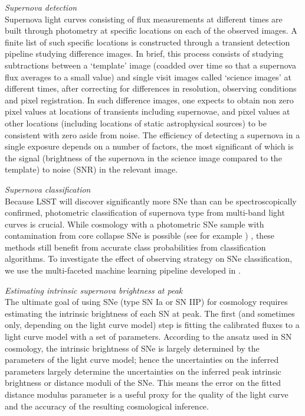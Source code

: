 {\emph{Supernova detection}}\\
Supernova light curves consisting of flux measurements at different times are built through photometry
at specific locations on each of the observed images. A finite list of such specific locations is
constructed through a transient detection pipeline studying difference images. In brief, this process
consists of studying subtractions between a  `template' image (coadded over time so that a supernova
flux averages to a small value) and single visit images called `science images' at different times,
after correcting for differences in resolution, observing conditions and pixel registration. In such
difference images, one expects to obtain non zero pixel values at locations of transients including
supernovae, and pixel values at other locations (including locations of static astrophysical
sources) to be
consistent with zero aside from noise. The efficiency of detecting a supernova in a single
exposure
depends on a number of factors, the most significant of which is the signal (brightness of the supernova
in the science image compared to the template) to noise (SNR) in the relevant image.


{\emph{Supernova classification}}\\
Because LSST will discover significantly more SNe than can be spectroscopically confirmed,
photometric classification of supernova type from multi-band light curves is crucial. While cosmology
with a photometric SNe sample with contamination from core collapse SNe is possible (see for
example 
\citet{Kunz2007,Newling2011,Hlozek2012,Knights2013,Bernstein2012,Gjergo2013,Campbell2013,Rubin2015,Jones2016})
,
these methods still benefit from accurate class probabilities from classification algorithms. To
investigate the effect of observing strategy on SNe classification, we use the multi-faceted machine
learning pipeline developed in \citet{Lochner2016}.


{\emph{Estimating intrinsic supernova brightness at peak}}\\
The ultimate goal of using SNe (type SN Ia or
SN IIP) for cosmology requires estimating the intrinsic brightness of each SN at peak. The first (and
sometimes only, depending on the light curve
model) step is fitting the calibrated fluxes to a light curve model with
a set of parameters. According to the ansatz used in SN cosmology, the
intrinsic brightness of SNe is largely determined by the parameters of
the light curve model; hence the uncertainties on the inferred
parameters largely determine the uncertainties on the inferred peak
intrinsic brightness or distance moduli of the SNe. This means the error on the fitted distance
modulus parameter is a useful proxy for the quality of the light curve and the accuracy of
the resulting cosmological inference.


